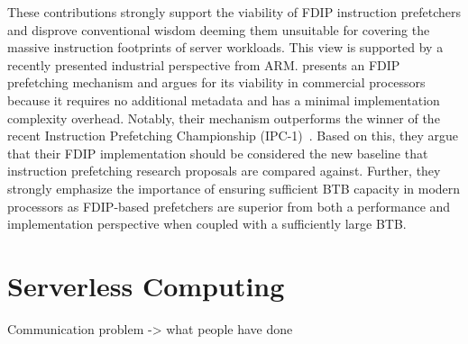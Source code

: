 \documentclass[../main.tex]{subfiles}
\begin{document}
\begin{refsection}
These contributions strongly support the viability of FDIP instruction
prefetchers and disprove conventional wisdom deeming them unsuitable
for covering the massive instruction footprints of server
workloads. This view is supported by a recently presented industrial
perspective from ARM. \textcite{ishii21_re_fetch_direc_instr_prefet}
presents an FDIP prefetching mechanism and argues for its viability in
commercial processors because it requires no additional metadata and
has a minimal implementation complexity overhead. Notably, their
mechanism outperforms the winner of the recent Instruction Prefetching
Championship (IPC-1)~\cite{ipc1}. Based on this, they argue that their
FDIP implementation should be considered the new baseline that
instruction prefetching research proposals are compared
against. Further, they strongly emphasize the importance of ensuring
sufficient BTB capacity in modern processors as FDIP-based prefetchers
are superior from both a performance and implementation perspective
when coupled with a sufficiently large BTB.













\section{Serverless Computing}
\label{sec:serverless}

Communication problem -> what people have done


\end{refsection}
\end{document}

